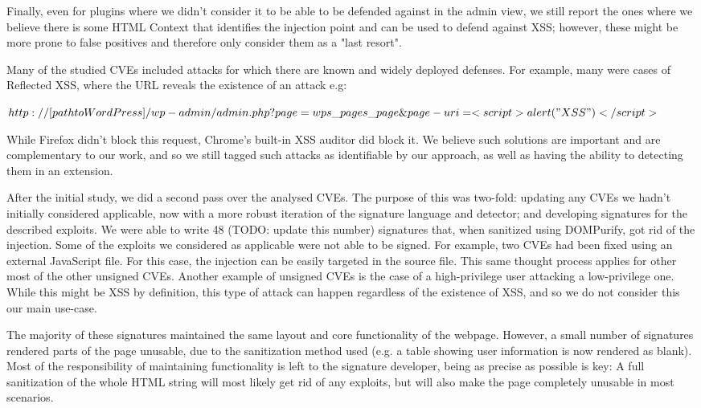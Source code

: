  Finally, even for plugins where we didn't consider it to be able to be defended against in the admin view, we still report the ones where we believe there is some HTML Context that identifies the injection point and can be used to defend against XSS; however, these might be more prone to false positives and therefore only consider them as a "last resort".

Many of the studied CVEs included attacks for which there are known and widely deployed defenses. For example, many were cases of Reflected XSS, where the URL reveals the existence of an attack e.g:


$http://[path to WordPress]/wp-admin/admin.php?page=wps\_pages\_page\&page-uri=<script>alert("XSS")</script>$

While Firefox didn't block this request, Chrome's built-in XSS auditor did block it. We believe such solutions are important and are complementary to our work, and so we still tagged such attacks as identifiable by our approach, as well as having the ability to detecting them in an extension.

After the initial study, we did a second pass over the analysed CVEs. The purpose of this was two-fold: updating any CVEs we hadn't initially considered applicable, now with a more robust iteration of the signature language and detector; and developing signatures for the described exploits. We were able to write 48 (TODO: update this number) signatures that, when sanitized using DOMPurify, got rid of the injection. Some of the exploits we considered as applicable were not able to be signed. For example, two CVEs had been fixed using an external JavaScript file. For this case, the injection can be easily targeted in the source file. This same thought process applies for other most of the other unsigned CVEs. Another example of unsigned CVEs is the case of a high-privilege user attacking a low-privilege one. While this might be XSS by definition, this type of attack can happen regardless of the existence of XSS, and so we do not consider this our main use-case.

The majority of these signatures maintained the same layout and core functionality of the webpage. However, a small number of signatures rendered parts of the page unusable, due to the sanitization method used (e.g. a table showing user information is now rendered as blank). Most of the responsibility of maintaining functionality is left to the signature developer, being as precise as possible is key: A full sanitization of the whole HTML string will most likely get rid of any exploits, but will also make the page completely unusable in most scenarios.


